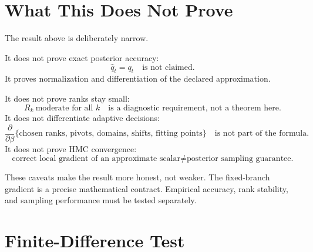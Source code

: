\documentclass[11pt]{article}
\begin{document}
\section{What This Does Not Prove}

The result above is deliberately narrow.

It does not prove exact posterior accuracy:
\[
    \widehat q_t=q_t
    \quad\text{is not claimed.}
    \tag{P19-90}
\]
It proves normalization and differentiation of the declared approximation.

It does not prove ranks stay small:
\[
    R_k\ \text{moderate for all }k
    \quad\text{is a diagnostic requirement, not a theorem here.}
    \tag{P19-91}
\]
It does not differentiate adaptive decisions:
\[
    \frac{\partial}{\partial\beta}
    \{\text{chosen ranks, pivots, domains, shifts, fitting points}\}
    \quad\text{is not part of the formula.}
    \tag{P19-92}
\]
It does not prove HMC convergence:
\[
    \text{correct local gradient of an approximate scalar}
    \ne
    \text{posterior sampling guarantee.}
    \tag{P19-93}
\]

These caveats make the result more honest, not weaker.  The fixed-branch
gradient is a precise mathematical contract.  Empirical accuracy, rank
stability, and sampling performance must be tested separately.

\section{Finite-Difference Test}
\end{document}
